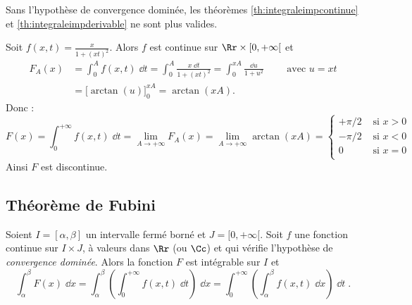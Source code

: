 \documentclass[class=report,crop=false]{standalone}
\begin{document}
Sans l'hypothèse de convergence dominée, les théorèmes \ref{th:integraleimpcontinue} et 
\ref{th:integraleimpderivable} ne sont plus valides.

\begin{exemple}
Soit $f(x,t)=\displaystyle\frac{x}{1+(xt)^2}$. 
Alors $f$ est continue sur $\Rr\times [0,+\infty[$ et
\begin{align*}
F_A(x) 
& = \int_0^A f(x,t)\;\dd t  
 = \int_0^A \frac{x\;\dd t}{1+(xt)^2} 
 = \int_0^{xA} \frac{\dd u}{1+u^2} \qquad\text{ avec } u=xt \\
& = \Big[\arctan(u)\Big]_0^{xA}
= \arctan(xA).
\end{align*}
Donc :
$$F(x)=\int_0^{+\infty} f(x,t)\;\dd t
= \lim_{A \to +\infty} F_A(x)
= \lim_{A \to +\infty}\arctan(xA)
= 
\begin{cases} 
 +\pi/2 & \text{ si $x>0$}\\
 -\pi/2 & \text{ si $x<0$}\\
 0      & \text{ si $x=0$}\\
\end{cases}$$
Ainsi $F$ est discontinue.
\end{exemple}

\subsection{Théorème de Fubini}


\begin{theoreme}
\label{th:fubiniimp}
Soient $I=[\alpha,\beta]$ un intervalle fermé borné 
et $J=[0,+\infty[$.
Soit $f$ une fonction continue sur $I\times J$,
à valeurs dans $\Rr$ (ou $\Cc$) et qui vérifie l'hypothèse 
de \emph{convergence dominée}. Alors la fonction $F$ est intégrable sur $I$ et
$$\int_\alpha^\beta F(x)\;\dd x =
\int_\alpha^\beta\left(\int_0^{+\infty}
  f(x,t)\;\dd t\right)\;\dd x = \int_0^{+\infty}\left(\int_\alpha^\beta
  f(x,t)\;\dd x\right)\;\dd t\;.$$
\end{theoreme}


\end{document}
